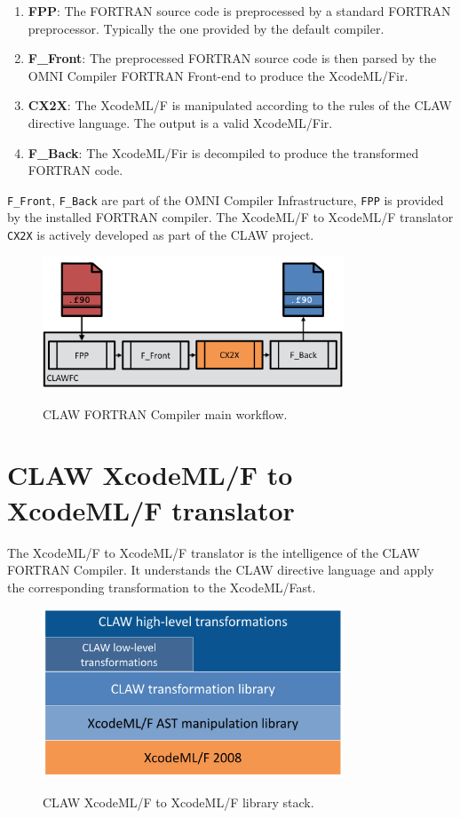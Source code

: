 \documentclass[a4paper, 11pt]{report}
\def\clawfcomp{CLAW FORTRAN Compiler\xspace}
\def\omni{OMNI Compiler Infrastructure\xspace}
\def\xcodeml{XcodeML/F\xspace}
\def\ffront{\lstinline!F_Front!\xspace}
\def\fback{\lstinline!F_Back!\xspace}
\def\fpp{\lstinline!FPP!\xspace}
\def\cx2x{\lstinline!CX2X!\xspace}
\begin{document}
\begin{enumerate}
\item \textbf{FPP}: The FORTRAN source code is preprocessed by a standard FORTRAN preprocessor. Typically the one provided by the default compiler. 
\item \textbf{F\_Front}: The preprocessed FORTRAN source code is then parsed by the OMNI Compiler FORTRAN Front-end to produce the \xcodeml \gls{ir}.
\item \textbf{CX2X}: The \xcodeml is manipulated according to the rules of the CLAW directive language. The output is a valid \xcodeml \gls{ir}.
\item \textbf{F\_Back}: The \xcodeml \gls{ir} is decompiled to produce the transformed FORTRAN code. 
\end{enumerate}

\ffront{}, \fback{} are part of the \omni{}, \fpp{} is provided by the installed FORTRAN compiler. The \xcodeml to \xcodeml translator \cx2x{} is actively developed as part of the CLAW project.  

\begin{figure}[!ht]
  \centering
  \includegraphics[width=0.8\textwidth]{resources/clawfc_global_workflow.png} \\
  \caption{CLAW FORTRAN Compiler main workflow.}
  \label{fig:clawfc_main_workflow}
\end{figure}

\section{CLAW \xcodeml to \xcodeml translator}
The \xcodeml to \xcodeml translator is the intelligence of the \clawfcomp. It understands the CLAW directive language and apply the corresponding transformation to the \xcodeml \gls{ast}.

\begin{figure}[!ht]
  \centering
  \includegraphics[width=0.8\textwidth]{resources/cx2x_stack.png} \\
  \caption{CLAW \xcodeml to \xcodeml library stack.}
  \label{fig:cx2x_stack}
\end{figure}
\end{document}
